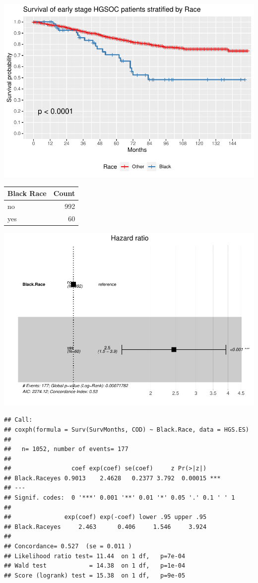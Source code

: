 \documentclass[
]{article}
\begin{document}
\includegraphics{EarlyOvaryRace_files/figure-latex/unnamed-chunk-2-1.pdf}

\begin{tabular}[t]{l|r}
\hline
Black Race & Count\\
\hline
no & 992\\
\hline
yes & 60\\
\hline
\end{tabular}

\includegraphics{EarlyOvaryRace_files/figure-latex/unnamed-chunk-3-1.pdf}

\begin{verbatim}
## Call:
## coxph(formula = Surv(SurvMonths, COD) ~ Black.Race, data = HGS.ES)
## 
##   n= 1052, number of events= 177 
## 
##                 coef exp(coef) se(coef)     z Pr(>|z|)    
## Black.Raceyes 0.9013    2.4628   0.2377 3.792  0.00015 ***
## ---
## Signif. codes:  0 '***' 0.001 '**' 0.01 '*' 0.05 '.' 0.1 ' ' 1
## 
##               exp(coef) exp(-coef) lower .95 upper .95
## Black.Raceyes     2.463      0.406     1.546     3.924
## 
## Concordance= 0.527  (se = 0.011 )
## Likelihood ratio test= 11.44  on 1 df,   p=7e-04
## Wald test            = 14.38  on 1 df,   p=1e-04
## Score (logrank) test = 15.38  on 1 df,   p=9e-05
\end{verbatim}
\end{document}
